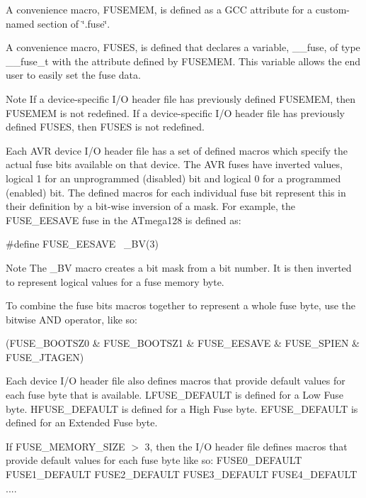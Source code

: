 A convenience macro, F\+U\+S\+E\+M\+EM, is defined as a G\+CC attribute for a custom-\/named section of \char`\"{}.\+fuse\char`\"{}.

A convenience macro, F\+U\+S\+ES, is defined that declares a variable, \+\_\+\+\_\+fuse, of type \+\_\+\+\_\+fuse\+\_\+t with the attribute defined by F\+U\+S\+E\+M\+EM. This variable allows the end user to easily set the fuse data.

\begin{DoxyNote}{Note}
If a device-\/specific I/O header file has previously defined F\+U\+S\+E\+M\+EM, then F\+U\+S\+E\+M\+EM is not redefined. If a device-\/specific I/O header file has previously defined F\+U\+S\+ES, then F\+U\+S\+ES is not redefined.
\end{DoxyNote}
Each A\+VR device I/O header file has a set of defined macros which specify the actual fuse bits available on that device. The A\+VR fuses have inverted values, logical 1 for an unprogrammed (disabled) bit and logical 0 for a programmed (enabled) bit. The defined macros for each individual fuse bit represent this in their definition by a bit-\/wise inversion of a mask. For example, the F\+U\+S\+E\+\_\+\+E\+E\+S\+A\+VE fuse in the A\+Tmega128 is defined as\+: 
\begin{DoxyCode}
\textcolor{preprocessor}{#define FUSE\_EESAVE      ~\_BV(3)}
\end{DoxyCode}
 \begin{DoxyNote}{Note}
The \+\_\+\+BV macro creates a bit mask from a bit number. It is then inverted to represent logical values for a fuse memory byte.
\end{DoxyNote}
To combine the fuse bits macros together to represent a whole fuse byte, use the bitwise A\+ND operator, like so\+: 
\begin{DoxyCode}
(FUSE\_BOOTSZ0 & FUSE\_BOOTSZ1 & FUSE\_EESAVE & FUSE\_SPIEN & FUSE\_JTAGEN)
\end{DoxyCode}


Each device I/O header file also defines macros that provide default values for each fuse byte that is available. L\+F\+U\+S\+E\+\_\+\+D\+E\+F\+A\+U\+LT is defined for a Low Fuse byte. H\+F\+U\+S\+E\+\_\+\+D\+E\+F\+A\+U\+LT is defined for a High Fuse byte. E\+F\+U\+S\+E\+\_\+\+D\+E\+F\+A\+U\+LT is defined for an Extended Fuse byte.

If F\+U\+S\+E\+\_\+\+M\+E\+M\+O\+R\+Y\+\_\+\+S\+I\+ZE $>$ 3, then the I/O header file defines macros that provide default values for each fuse byte like so\+: F\+U\+S\+E0\+\_\+\+D\+E\+F\+A\+U\+LT F\+U\+S\+E1\+\_\+\+D\+E\+F\+A\+U\+LT F\+U\+S\+E2\+\_\+\+D\+E\+F\+A\+U\+LT F\+U\+S\+E3\+\_\+\+D\+E\+F\+A\+U\+LT F\+U\+S\+E4\+\_\+\+D\+E\+F\+A\+U\+LT ....

